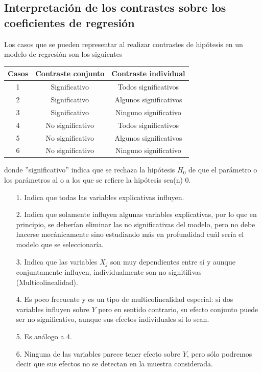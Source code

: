 \subsection{Interpretación de los contrastes sobre los coeficientes de regresión}
Los casos que se pueden representar al realizar contrastes de hipótesis en un modelo de regresión son los siguientes

\begin{center}
    \begin{tabular}{|c|c|c|}
        \hline
        Casos & Contraste conjunto & Contraste individual   \\ \hline
        1     & Significativo      & Todos significativos   \\
        2     & Significativo      & Algunos significativos \\
        3     & Significativo      & Ninguno significativo  \\
        4     & No significativo   & Todos significativos   \\
        5     & No significativo   & Algunos significativos \\
        6     & No significativo   & Ninguno significativo  \\ \hline
    \end{tabular}
\end{center}

donde ''significativo'' indica que se rechaza la hipótesis $H_0$ de que el parámetro o los parámetros al o a los que se refiere la hipótesis sea(n) 0.

\begin{enumerate}
    \item[1.] Indica que todas las variables explicativas influyen.
    \item[2.] Indica que solamente influyen algunas variables explicativas, por lo que en principio, se deberían eliminar las no significativas del modelo, pero no debe hacerse mecánicamente sino estudiando más en profundidad cuál sería el modelo que se seleccionaría.
    \item[3.] Indica que las variables $X_j$ son muy dependientes entre sí y aunque conjuntamente influyen, individualmente son no signitifivas (Multicolinealidad).
    \item[4.] Es poco frecuente y es un tipo de multicolinealidad especial: si dos variables influyen sobre $Y$ pero en sentido contrario, su efecto conjunto puede ser no significativo, aunque sus efectos individuales si lo sean.
    \item[5.] Es análogo a 4.
    \item[6.] Ninguna de las variables parece tener efecto sobre $Y$, pero sólo podremos decir que sus efectos no se detectan en la muestra considerada.
\end{enumerate}


